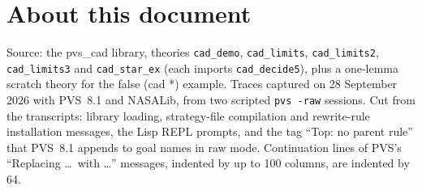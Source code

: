 \documentclass[11pt]{article}
\begin{document}
\section*{About this document}
\small
Source: the pvs\_cad library, theories \texttt{cad\_demo}, \texttt{cad\_limits}, \texttt{cad\_limits2}, \texttt{cad\_limits3} and
\texttt{cad\_star\_ex} (each imports \texttt{cad\_decide5}), plus a one-lemma scratch theory for the false (cad *) example. Traces captured on 28 September 2026 with PVS~8.1
and NASALib, from two scripted \texttt{pvs -raw} sessions. Cut from the transcripts: library loading, strategy-file compilation and
rewrite-rule installation messages, the Lisp REPL prompts, and the tag ``Top: no parent rule'' that PVS~8.1 appends to goal names in raw mode. Continuation lines of PVS's ``Replacing \dots\ with \dots'' messages, indented by up to 100 columns, are indented by 64.
\end{document}
